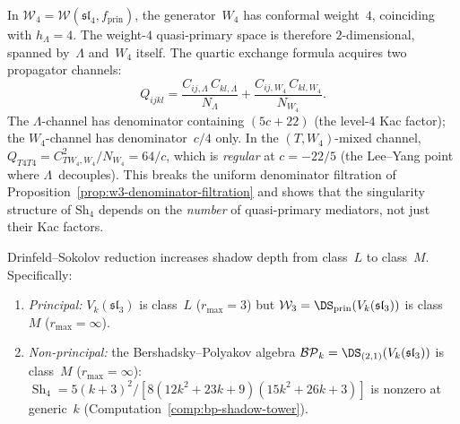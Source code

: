 \begin{remark}
\label{rem:nms-w4-two-propagator}%
%
In $\mathcal{W}_4 = \mathcal{W}(\mathfrak{sl}_4, f_{\mathrm{prin}})$,
the generator~$W_4$ has conformal weight~$4$, coinciding with
$h_\Lambda = 4$. The weight-$4$ quasi-primary space is therefore
$2$-dimensional, spanned by~$\Lambda$ and~$W_4$ itself. The quartic
exchange formula acquires two propagator channels:
\[
Q_{ijkl}
= \frac{C_{ij,\Lambda}\,C_{kl,\Lambda}}{N_\Lambda}
+ \frac{C_{ij,W_4}\,C_{kl,W_4}}{N_{W_4}}.
\]
The $\Lambda$-channel has denominator containing $(5c+22)$
(the level-$4$ Kac factor); the $W_4$-channel has denominator~$c/4$
only. In the $(T,W_4)$-mixed channel,
$Q_{T4T4} = C_{TW_4,W_4}^2/N_{W_4} = 64/c$,
which is \emph{regular} at $c = -22/5$ (the Lee--Yang point where
$\Lambda$~decouples). This breaks the uniform denominator filtration
of Proposition~\ref{prop:w3-denominator-filtration}
and shows that the singularity structure of $\mathrm{Sh}_4$ depends
on the \emph{number} of quasi-primary mediators, not just their Kac
factors.
\end{remark}


\begin{theorem}
\label{thm:ds-shadow-depth-increase}%
%
%
Drinfeld--Sokolov reduction increases shadow depth from
class~$L$ to class~$M$. Specifically:
\begin{enumerate}[label=\textup{(\roman*)}]
\item \emph{Principal:}
 $V_k(\mathfrak{sl}_3)$ is class~$L$ ($r_{\max} = 3$) but
 $\mathcal{W}_3 = \DS_{\mathrm{prin}}(V_k(\mathfrak{sl}_3))$
 is class~$M$ ($r_{\max} = \infty$).
\item \emph{Non-principal:}
 the Bershadsky--Polyakov algebra
 $\mathcal{BP}_k = \DS_{(2,1)}(V_k(\mathfrak{sl}_3))$
 is class~$M$ ($r_{\max} = \infty$):
 $\operatorname{Sh}_4 =
 5(k{+}3)^2/[8(12k^2{+}23k{+}9)(15k^2{+}26k{+}3)]$
 is nonzero at generic~$k$
 \textup{(}Computation~\textup{\ref{comp:bp-shadow-tower})}.
\end{enumerate}
\end{theorem}


